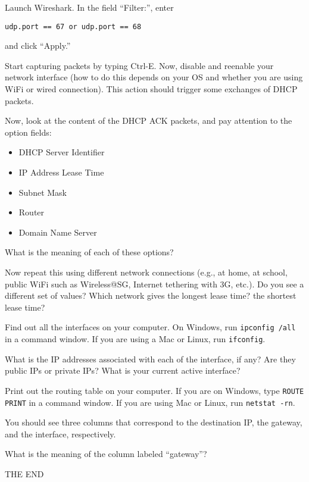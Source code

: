 \documentclass[a4paper,11pt]{exam}
\begin{document}
\begin{questions}

\question Launch Wireshark.  In the field ``Filter:'', enter 
\begin{verbatim}
udp.port == 67 or udp.port == 68
\end{verbatim}
and click ``Apply.''

Start capturing packets by typing Ctrl-E.  Now, disable and reenable your network interface (how to do this depends on your OS and whether you are using WiFi or wired connection).  This action should trigger some exchanges of DHCP packets.  

Now, look at the content of the DHCP ACK packets, and pay attention to the option fields:
\begin{itemize}
	\item DHCP Server Identifier
	\item IP Address Lease Time
	\item Subnet Mask
	\item Router
	\item Domain Name Server
\end{itemize}

What is the meaning of each of these options?

Now repeat this using different network connections (e.g., at home, at school, public WiFi such as Wireless@SG, Internet tethering with 3G, etc.).  Do you see a different set of values?  Which network gives the longest lease time? the shortest lease time?

\question

Find out all the interfaces on your computer.  On Windows, run \texttt{ipconfig /all} in a command window.  If you are using a Mac or Linux, run \texttt{ifconfig}.

What is the IP addresses associated with each of the interface, if any?  Are they public IPs or private IPs?  What is your current active interface?

\question

Print out the routing table on your computer.  If you are on Windows, type \texttt{ROUTE PRINT} in a command window.  If you are using Mac or Linux, run \texttt{netstat -rn}.

You should see three columns that correspond to the destination IP, the gateway, and the interface, respectively.  

What is the meaning of the column labeled ``gateway''?

\end{questions}

\vfill
\begin{center}
    \textsf{\Huge THE END}
\end{center}
\end{document}
